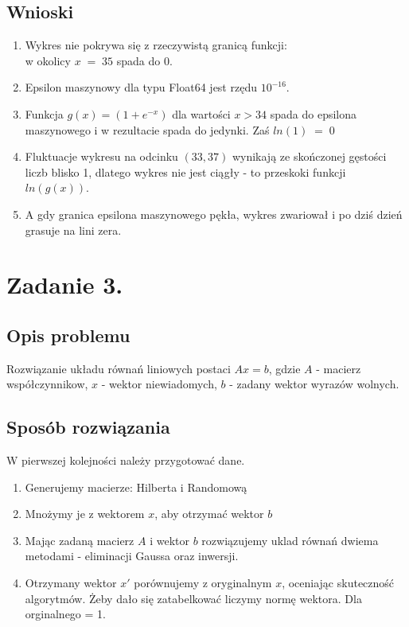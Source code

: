 \documentclass[12pt]{article}
\begin{document}
\subsection{Wnioski}
\begin{enumerate}
\item Wykres nie pokrywa się z rzeczywistą granicą funkcji: \\w okolicy $x\;=\;35$ spada do 0.
\item Epsilon maszynowy dla typu Float64 jest rzędu $10^{-16}$.
\item Funkcja $g(x) = (1 + e^{-x})$ dla wartości $x > 34$ spada do epsilona maszynowego i w rezultacie spada do jedynki. Zaś $ln(1)\;=\;0$
\item Fluktuacje wykresu na odcinku $(33, 37)$ 
wynikają ze skończonej gęstości liczb blisko 1, dlatego wykres nie jest ciągły - to przeskoki funkcji $ln(g(x))$.
\item A gdy granica epsilona maszynowego pękła, wykres zwariował i po dziś dzień grasuje na lini zera.
\end{enumerate}
   

\section{Zadanie 3.}

\subsection{Opis problemu}
Rozwiązanie układu równań liniowych postaci $Ax = b$,
gdzie $A$ - macierz współczynnikow, $x$ - wektor niewiadomych, $b$ - zadany wektor wyrazów wolnych.

\subsection{Sposób rozwiązania}
W pierwszej kolejności należy przygotować dane.
\begin{enumerate}
  \item Generujemy macierze: Hilberta i Randomową
  \item Mnożymy je z wektorem $x$, aby otrzymać wektor $b$
  \item Mając zadaną macierz $A$ i wektor $b$ rozwiązujemy uklad równań dwiema metodami - eliminacji Gaussa
  oraz inwersji.
  \item Otrzymany wektor $x'$ porównujemy z oryginalnym $x$, oceniając skuteczność algorytmów.
  Żeby dało się zatabelkować liczymy normę wektora. Dla orginalnego = 1.
\end{enumerate}
\newpage
\end{document}
